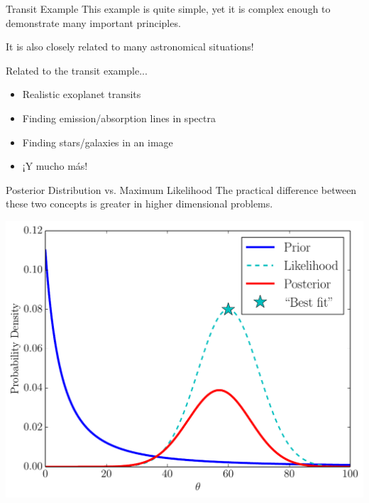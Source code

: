 \begin{frame}[t]{Transit Example}
This example is quite simple, yet it is complex enough to demonstrate many
important principles.
\vspace{1cm}

It is also closely related to many astronomical situations!
\end{frame}


\begin{frame}[t]{Related to the transit example...}
\begin{itemize}
\item Realistic exoplanet transits
\item Finding emission/absorption lines in spectra
\item Finding stars/galaxies in an image
\item ¡Y mucho más!
\end{itemize}
\end{frame}


\begin{frame}[t]{Posterior Distribution vs. Maximum Likelihood}
The practical difference between these two concepts is greater in higher
dimensional problems.
\begin{center}
\includegraphics[scale=0.35]{bayes.pdf}
\end{center}
\end{frame}





